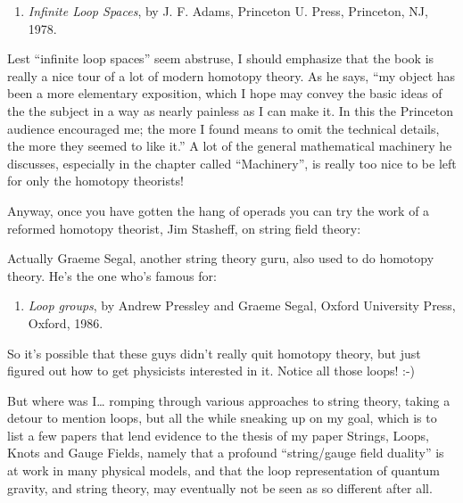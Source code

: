 \documentclass{article}
\def\tightlist{}
\renewcommand{\texttt}[1]{%
  \begingroup
  \ttfamily
  \begingroup\lccode`~=`/\lowercase{\endgroup\def~}{/\discretionary{}{}{}}%
  \begingroup\lccode`~=`[\lowercase{\endgroup\def~}{[\discretionary{}{}{}}%
  \begingroup\lccode`~=`.\lowercase{\endgroup\def~}{.\discretionary{}{}{}}%
  \catcode`/=\active\catcode`[=\active\catcode`.=\active
  \scantokens{#1\noexpand}%
  \endgroup
}
\begin{document}
\begin{enumerate}
\def\labelenumi{\arabic{enumi})}
\setcounter{enumi}{6}
\tightlist
\item
  \emph{Infinite Loop Spaces}, by J. F. Adams, Princeton U. Press,
  Princeton, NJ, 1978.
\end{enumerate}

Lest ``infinite loop spaces'' seem abstruse, I should emphasize that the
book is really a nice tour of a lot of modern homotopy theory. As he
says, ``my object has been a more elementary exposition, which I hope
may convey the basic ideas of the the subject in a way as nearly
painless as I can make it. In this the Princeton audience encouraged me;
the more I found means to omit the technical details, the more they
seemed to like it.'' A lot of the general mathematical machinery he
discusses, especially in the chapter called ``Machinery'', is really too
nice to be left for only the homotopy theorists!

Anyway, once you have gotten the hang of operads you can try the work of
a reformed homotopy theorist, Jim Stasheff, on string field theory:


Actually Graeme Segal, another string theory guru, also used to do
homotopy theory. He's the one who's famous for:

\begin{enumerate}
\def\labelenumi{\arabic{enumi})}
\setcounter{enumi}{8}
\tightlist
\item
  \emph{Loop groups}, by Andrew Pressley and Graeme Segal, Oxford
  University Press, Oxford, 1986.
\end{enumerate}

So it's possible that these guys didn't really quit homotopy theory, but
just figured out how to get physicists interested in it. Notice all
those loops! :-)

But where was I\ldots{} romping through various approaches to string
theory, taking a detour to mention loops, but all the while sneaking up
on my goal, which is to list a few papers that lend evidence to the
thesis of my paper Strings, Loops, Knots and Gauge Fields, namely that a
profound ``string/gauge field duality'' is at work in many physical
models, and that the loop representation of quantum gravity, and string
theory, may eventually not be seen as so different after all.
\end{document}
